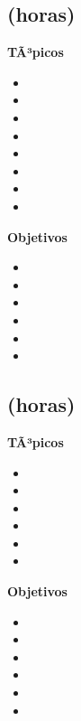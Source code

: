 \subsection{\NCDOSDef  (\NCDOSHours horas)}\label{sec:BOK-NC2}

\textbf{TÃ³picos}
\begin{itemize}
	\item \NCDOSTopicEstandares
	\item \NCDOSTopicEl
	\item \NCDOSTopicConmutacion
	\item \NCDOSTopicFlujos
	\item \NCDOSTopicConceptos
	\item \NCDOSTopicConceptosde
	\item \NCDOSTopicTrabajo
	\item \NCDOSTopicServicios
\end{itemize}

\textbf{Objetivos}
\begin{itemize}
	\item \NCDOSObjUNO
	\item \NCDOSObjDOS
	\item \NCDOSObjTRES
	\item \NCDOSObjCUATRO
	\item \NCDOSObjCINCO
	\item \NCDOSObjSEIS
\end{itemize}

\subsection{\NCTRESDef  (\NCTRESHours horas)}\label{sec:BOK-NC3}

\textbf{TÃ³picos}
\begin{itemize}
	\item \NCTRESTopicFundamentos
	\item \NCTRESTopicAlgoritmos
	\item \NCTRESTopicAlgoritmosde
	\item \NCTRESTopicAutenticacion
	\item \NCTRESTopicFirmas
	\item \NCTRESTopicEjemplos
\end{itemize}

\textbf{Objetivos}
\begin{itemize}
	\item \NCTRESObjUNO
	\item \NCTRESObjDOS
	\item \NCTRESObjTRES
	\item \NCTRESObjCUATRO
	\item \NCTRESObjCINCO
	\item \NCTRESObjSEIS
\end{itemize}


